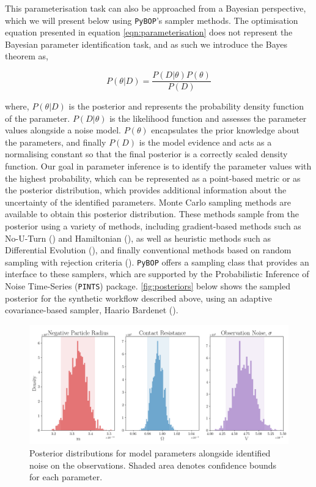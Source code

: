 \documentclass[
]{article}
\begin{document}
This parameterisation task can also be approached from a Bayesian
perspective, which we will present below using \texttt{PyBOP}'s sampler
methods. The optimisation equation presented in equation
\autoref{eqn:parameterisation} does not represent the Bayesian parameter
identification task, and as such we introduce the Bayes theorem as,

\begin{equation}
P(\theta|D) = \frac{P(D|\theta)P(\theta)}{P(D)}
\label{eqn:bayes_theorem}
\end{equation}

where, \(P(\theta|D)\) is the posterior and represents the probability
density function of the parameter. \(P(D|\theta)\) is the likelihood
function and assesses the parameter values alongside a noise model.
\(P(\theta)\) encapsulates the prior knowledge about the parameters, and
finally \(P(D)\) is the model evidence and acts as a normalising
constant so that the final posterior is a correctly scaled density
function. Our goal in parameter inference is to identify the parameter
values with the highest probability, which can be represented as a
point-based metric or as the posterior distribution, which provides
additional information about the uncertainty of the identified
parameters. Monte Carlo sampling methods are available to obtain this
posterior distribution. These methods sample from the posterior using a
variety of methods, including gradient-based methods such as No-U-Turn
() and Hamiltonian
(), as well as
heuristic methods such as Differential Evolution
(), and finally
conventional methods based on random sampling with rejection criteria
().
\texttt{PyBOP} offers a sampling class that provides an interface to
these samplers, which are supported by the Probabilistic Inference of
Noise Time-Series (\texttt{PINTS}) package. \autoref{fig:posteriors}
below shows the sampled posterior for the synthetic workflow described
above, using an adaptive covariance-based sampler, Haario Bardenet
().

\begin{figure}
\centering
\includegraphics[width=1\textwidth,height=\textheight]{figures/joss/posteriors.png}
\caption{Posterior distributions for model parameters alongside
identified noise on the observations. Shaded area denotes confidence
bounds for each parameter. \label{fig:posteriors}}
\end{figure}
\end{document}
